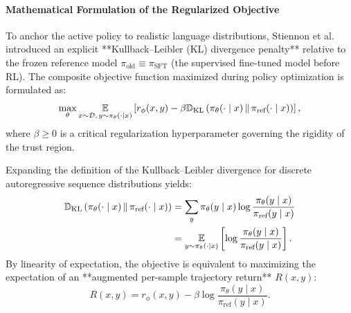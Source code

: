 \documentclass[../../main.tex]{subfiles}
\begin{document}
\paragraph{Mathematical Formulation of the Regularized Objective}
To anchor the active policy to realistic language distributions, Stiennon et al. introduced an explicit **Kullback--Leibler (KL) divergence penalty** relative to the frozen reference model $\pi_{\text{old}} \equiv \pi_{\text{SFT}}$ (the supervised fine-tuned model before RL). The composite objective function maximized during policy optimization is formulated as:
\begin{equation}
\label{eq:composite_ppo_reward}
\max_{\theta} \operatorname*{\mathbb{E}}_{x \sim \mathcal{D},\, y \sim \pi_\theta(\cdot \mid x)} \left[ r_\phi(x, y) - \beta \mathbb{D}_{\text{KL}}\left(\pi_\theta(\cdot \mid x) \,\|\, \pi_{\text{ref}}(\cdot \mid x)\right) \right],
\end{equation}
where $\beta \ge 0$ is a critical regularization hyperparameter governing the rigidity of the trust region.

Expanding the definition of the Kullback--Leibler divergence for discrete autoregressive sequence distributions yields:
\begin{align}
\mathbb{D}_{\text{KL}}\left(\pi_\theta(\cdot \mid x) \,\|\, \pi_{\text{ref}}(\cdot \mid x)\right) &= \sum_{y} \pi_\theta(y \mid x) \log \frac{\pi_\theta(y \mid x)}{\pi_{\text{ref}}(y \mid x)} \\
&= \operatorname*{\mathbb{E}}_{y \sim \pi_\theta(\cdot \mid x)} \left[ \log \frac{\pi_\theta(y \mid x)}{\pi_{\text{ref}}(y \mid x)} \right].
\end{align}
By linearity of expectation, the objective is equivalent to maximizing the expectation of an **augmented per-sample trajectory return** $R(x, y)$:
\begin{equation}
\label{eq:per_sample_composite_reward}
R(x, y) = r_\phi(x, y) - \beta \log \frac{\pi_\theta(y \mid x)}{\pi_{\text{ref}}(y \mid x)}.
\end{equation}
\end{document}
